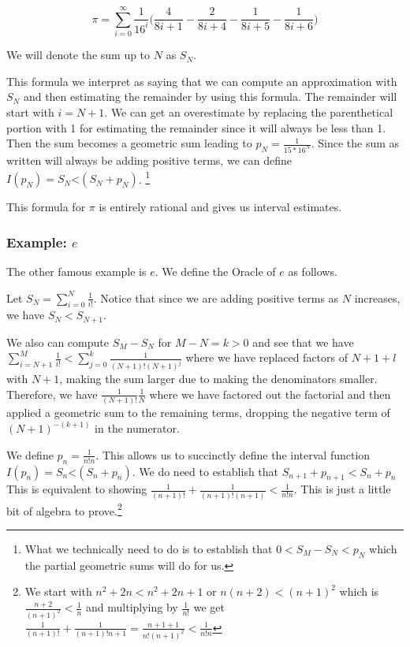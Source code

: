 \documentclass[12pt]{article}
\theoremstyle{remark}
\newcommand{\lt}{\mathord{<}}
\begin{document}
\[ 
\pi = \sum_{i=0}^\infty \frac{1}{16^i} \bigg( \frac{4}{8i+1} - \frac{2}{8i+4} - \frac{1}{8i+5} - \frac{1}{8i+6} \bigg)
\]

We will denote the sum up to $N$ as $S_N$.

This formula we interpret as saying that we can compute an approximation with $S_N$ and then estimating the remainder by using this formula. The remainder will start with $i=N+1$. We can get an overestimate by replacing the parenthetical portion with 1 for estimating the remainder since it will always be less than 1. Then the sum becomes a geometric sum leading to $p_N = \frac{1}{15*16^N}$. Since the sum as written will always be adding positive terms, we can define $I(p_N) = S_N \lt (S_N + p_N)$. \footnote{What we technically need to do is to establish that $0 < S_M - S_N < p_N $ which the partial geometric sums will do for us.}

This formula for $\pi$ is entirely rational and gives us interval estimates.

\subsubsection{Example: $e$}

The other famous example is $e$. We define the Oracle of $e$ as follows. 

Let $S_N = \sum_{i=0}^N \frac{1}{i!}$. Notice that since we are adding positive terms as $N$ increases, we have $S_N < S_{N+1}$. 

We also can compute $S_M - S_N$ for $M - N = k > 0$ and see that we have $\sum_{i=N+1}^M \frac{1}{i!} <  \sum_{j=0}^k  \frac{1}{(N+1)!(N+1)^j} $ where we have replaced factors of $N+1 + l$ with $N+1$, making the sum larger due to making the denominators smaller. Therefore, we have $\frac{1}{(N+1)!} \frac{1}{N}$ where we have factored out the factorial and then applied a geometric sum to the remaining terms, dropping the negative term of $(N+1)^{-(k+1)}$ in the numerator. 

We define $p_n = \frac{1}{n!n}$. This allows us to succinctly define the interval function $I(p_n) = S_n \lt (S_n + p_n)$. We do need to establish that $S_{n+1} + p_{n+1} < S_n + p_n$ This is equivalent to showing $\tfrac{1}{(n+1)!} + \tfrac{1}{(n+1)!(n+1)} < \tfrac{1}{n!n}$. This is just a little bit of algebra to prove.\footnote{We start with $n^2 + 2n < n^2 + 2n + 1$ or $n(n+2) < (n+1)^2$ which is $\tfrac{n+2}{(n+1)^2} < \tfrac{1}{n}$ and multiplying by $\frac{1}{n!}$ we get $\tfrac{1}{(n+1)!} + \tfrac{1}{(n+1)! n+1} = \tfrac{n+1 + 1}{n! (n+1)^2} < \tfrac{1}{n! n}$ }
 
\end{document}
